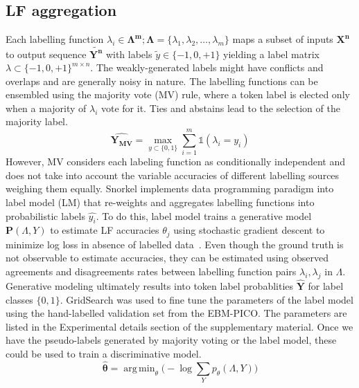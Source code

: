 \documentclass[10.7pt,]{article}
\DeclareMathOperator*{\argmin}{arg\,min}
\begin{document}
\subsection{LF aggregation}\label{lms}
%
Each labelling function $ \lambda_{i} \in \bm{\Lambda^{m}}; \bm{\Lambda} = \{\lambda_{1}, \lambda_{2}, \dotso, \lambda_{m} \} $ maps a subset of inputs $\bm{X^{n}}$ to output sequence $ \widetilde{\bm{Y^{n}}}$ with labels $\widetilde{y} \in \{-1, 0, +1\}$ yielding a label matrix $ \lambda \subset \{-1, 0, +1\}^{m \times n}$.
The weakly-generated labels might have conflicts and overlaps and are generally noisy in nature.
The labelling functions can be ensembled using the majority vote (MV) rule, where a token label is elected only when a majority of $\lambda_{i}$ vote for it.
Ties and abstains lead to the selection of the majority label.
%
\begin{equation}
\bm{\hat{Y_{MV}}} = \max_{{y \subset \{ 0, 1 \} }} \sum_{i=1}^{m} \mathds{1} (\lambda_{i} = y_{i})
\end{equation}
%
However, MV considers each labeling function as conditionally independent and does not take into account the variable accuracies of different labelling sources weighing them equally.
Snorkel implements data programming paradigm into label model (LM) that re-weights and aggregates labelling functions into probabilistic labels $\hat{y_{i}}$.
To do this, label model trains a generative model $ \bm{P} ( \Lambda , Y )$ to estimate LF accuracies $\theta_{j}$ using stochastic gradient descent to minimize log loss in absence of labelled data~\cite{ratner2017snorkel,dunnmon2020cross}.
Even though the ground truth is not observable to estimate accuracies, they can be estimated using observed agreements and disagreements rates between labelling function pairs $ \lambda_{i}, \lambda_{j}$ in $\Lambda$.
Generative modeling ultimately results into token label probablities $\bm{\hat{Y}}$ for label classes $ \{ 0, 1\} $.
GridSearch was used to fine tune the parameters of the label model using the hand-labelled validation set from the EBM-PICO.
The parameters are listed in the Experimental details section of the supplementary material.
Once we have the pseudo-labels generated by majority voting or the label model, these could be used to train a discriminative model.
%
\begin{equation}
\bm{\hat{\theta}} = \argmin_{\theta} \big( -\log \sum_{Y} p_{\theta} (\Lambda , Y ) \big)
\end{equation}
%
%
%
\end{document}

